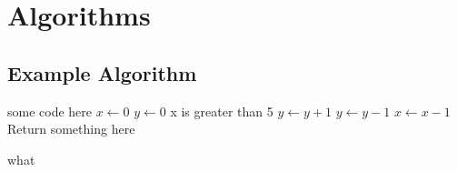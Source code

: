 \chapter{Algorithms}
\section{Example Algorithm}
\begin{algorithm}[H]
    \SetAlgoLined
    \SetNoFillComment
    \vspace{3mm}
    some code here\;
    $x \leftarrow 0$\;
    $y \leftarrow 0$\;
     {
        x is greater than 5 
    }
     {
        $y \leftarrow y + 1$\;
    }
     {
        $y \leftarrow y - 1$\;
    }
     {
        $x \leftarrow x - 1$\;
    }
    \Return Return something here\;
    \caption{what}
\end{algorithm}
